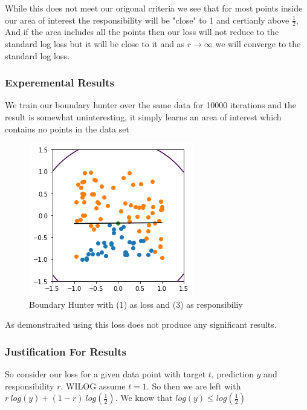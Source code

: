 \documentclass{article}
\begin{document}
While this does not meet our origonal criteria we see that for most points inside our area of interest the responsibility will be "close" to 1 and certianly above $\frac{1}{2}$, And if the area includes all the points then our loss will not reduce to the standard log loss but it will be close to it and as $r \to\infty$ we will converge to the standard log loss.

\subsubsection{Experemental Results}
We train our boundary hunter over the same data for 10000 iterations and the result is somewhat uninteresting, it simply learns an area of interest which contains no points in the data set

\begin{figure}[H]
\centering
  \begin{minipage}[b]{0.4\textwidth}
    \includegraphics[width=\textwidth]{BoundaryHunter-Attempt1-01.png}
    \caption{Boundary Hunter with (1) as loss and (3) as responsibiliy}
  \end{minipage}
  \hfill
\end{figure}

As demonstraited using this loss does not produce any significant results.

\subsubsection{Justification For Results}
So consider our loss for a given data point with target $t$, prediction $y$ and responsibility $r$. WILOG assume $t = 1$. So then we are left with $r\ log(y) + (1-r)\ log(\frac{1}{2})$. We know that $log(y) \leq log(\frac{1}{2})$
\end{document}
